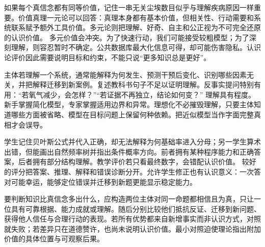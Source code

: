如果每个真信念都有同等价值，记住一串无关尘埃数目似乎与理解疾病原因一样重要。价值真理一元论可以回答：真理本身都有基本价值，但相关性、行动需要和系统联系赋予额外工具价值。多元论则把理解、好奇、自主和公正视为不可完全还原的认识价值。 多元价值会冲突。为了快速行动，我们可能接受较粗模型；为了深刻理解，则容忍暂时不确定。公共数据库最大化信息可得，却可能伤害隐私。认识论评价因此需要说明目标和约束，不能只说“更多知识总是更好”。

主体若理解一个系统，通常能解释为何发生、预测干预后变化、识别哪些因素无关，并把解释迁移到新案例。复述教科书句子不足以证明理解。反事实提问特别有用：“若氧气减少，会怎样？”“若证据不再独立，结论如何变？” 理解具有程度。新手掌握简化模型，专家掌握适用边界和异常。理想化不必摧毁理解，只要主体知道哪些方面被省略、模型在目标问题上保留何种依赖。把近似模型当作字面完整真相才会误导。

学生记住贝叶斯公式并代入正确，却无法解释为何基础率进入分母；另一学生算术出错，但能画出自然频率树并指出条件概率方向。前者拥有某种程序能力和正确答案，后者拥有部分结构理解。教学评价若只看最终数字，会错配认识价值。 较好的评分把答案、推理、解释和错误诊断分开。允许学生修正也有认识意义：一次答对可能幸运，能够定位错误并迁移到新题更能显示稳定能力。

要判断知识比真信念多出什么，应构造两位主体对同一命题都相信且为真，只让一位具有可靠根据、能力成就或理解。随后分别比较他们抵抗反证、迁移到新问题、获得他人信任与合理行动的表现。若所有优势都来自新增事实而非认识方式，对照就失败；若差异只在道德赞许，也尚未说明认识价值。最小对照迫使理论指出附加价值的具体位置与可观察后果。
